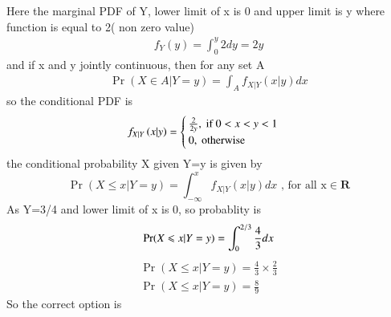 \documentclass[journal,12pt,twocolumn]{IEEEtran}
\begin{document}
\begin{enumerate}
\begin{equation}
\end{equation}
Here the marginal PDF of Y, lower limit of x is 0 and upper limit is y where  function is equal to 2( non zero value)
\begin{align}
f_Y(y)= \int_{0}^{y}2dy = 2y
\end{align}
and if x and y jointly continuous, then for any set A
\begin{align}
 \Pr(X \in A | Y = y) = \int_{A} f_{X|Y}(x|y)dx
\end{align}
so the conditional PDF is 
\begin{align}
f_{X|Y}\left(x|y\right)= \begin{cases}
\frac{2}{2y}, \text{ if } 0<x<y<1\\
0, \text{ otherwise }
\end{cases}
\end{align}
the conditional probability X given Y=y is given by
\begin{equation}
\Pr(X\leqslant x|Y=y)=\int_{-\infty}^{x} f_{X|Y}(x|y)dx \text{ ,  for all x} \in \mathbf{R}  
\end{equation}
As Y=3/4 and lower limit of x is 0, so probablity is 
\begin{equation}
\Pr(X\leqslant x|Y=y)=\int_{0}^{2/3} \frac{4}{3}dx\\
\end{equation}
\begin{align}
\Pr(X\leqslant x|Y=y)=\frac{4}{3}\times \frac{2}{3}\\
\Pr(X\leqslant x|Y=y)=\frac{8}{9} 
\end{align}
So the correct option is 
\end{enumerate}
\end{document}
